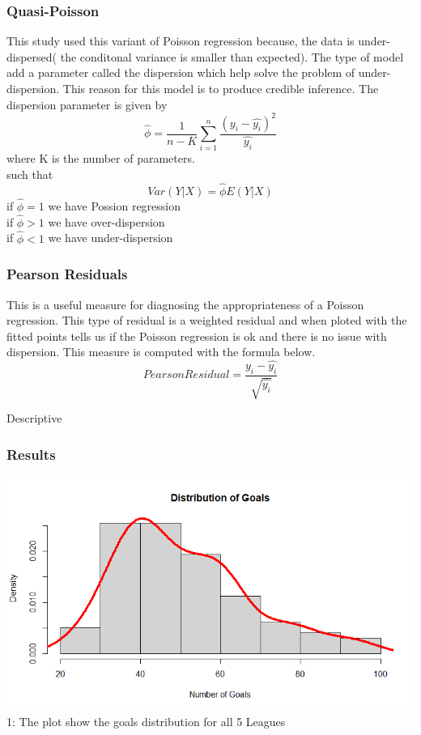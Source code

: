 \documentclass[11pt]{beamer}
\begin{document}
	\begin{frame}
		\frametitle{Quasi-Poisson}
		This study used this variant of Poisson regression because, the data is under-dispersed( the conditonal variance is smaller than expected).
		The type of model add a parameter called the dispersion which help solve the problem of under-dispersion. This reason for this model is to produce credible inference. 
		The dispersion parameter is given by
		\[\hat{\phi}=\frac{1}{n-K}\sum_{i=1}^{n}\frac{(y_i-\hat{y_i})^2}{\hat{y_i}}\]
		where K is the number of parameters.\\
		such that
		\[Var(Y|X)=\hat{\phi}E(Y|X) \]
		if $\hat{\phi}=1$ we have Possion regression\\
		if $\hat{\phi}>1$ we have over-dispersion\\
		if $\hat{\phi}<1$ we have under-dispersion
		
	\end{frame}
	\begin{frame}
		\frametitle{Pearson Residuals}
		This is a useful measure for diagnosing the appropriateness of a Poisson regression. This type of residual is a weighted residual and when ploted with the fitted points tells us if the Poisson regression is ok and there is no issue with dispersion. This measure is computed with the formula below.
		\[Pearson Residual=\frac{y_i-\hat{y_i}}{\sqrt{\hat{y_i}}}\]  
	\end{frame}
		\begin{frame}{Descriptive}
		\frametitle{Results}
		\includegraphics[scale=0.5]{gls1}
		\figurename 1: The plot show the goals distribution for all 5 Leagues
	\end{frame}
	
\end{document}
